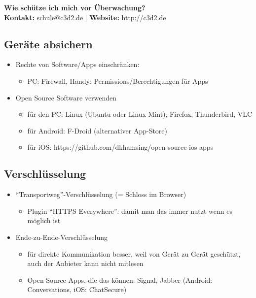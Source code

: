 {\Large \textbf{Wie schütze ich mich vor Überwachung?}}\\
\textbf{Kontakt:} schule@c3d2.de | \textbf{Website:} http://c3d2.de
\vspace{2mm}

\subsection*{Geräte absichern}
\begin{itemize}
  \item Rechte von Software/Apps einschränken:
  \begin{itemize}
    \item PC: Firewall, Handy: Permissions/Berechtigungen für Apps
  \end{itemize}
  \item Open Source Software verwenden
  \begin{itemize}
    \item für den PC: Linux (Ubuntu oder Linux Mint), Firefox, Thunderbird, VLC
    \item für Android: F-Droid (alternativer App-Store)
    \item für iOS: https://github.com/dkhamsing/open-source-ios-apps
  \end{itemize}
\end{itemize}
  
\subsection*{Verschlüsselung}
\begin{itemize}
  \item ``Transportweg''-Verschlüsselung (= Schloss im Browser)
  \begin{itemize}
    \item Plugin ``HTTPS Everywhere'': damit man das immer nutzt wenn es möglich ist
  \end{itemize}
  \item Ende-zu-Ende-Verschlüsselung
  \begin{itemize}
    \item für direkte Kommunikation besser, weil von Gerät zu Gerät geschützt, auch der Anbieter kann nicht mitlesen
    \item Open Source Apps, die das können: Signal, Jabber (Android: Conversations, iOS: ChatSecure)
  \end{itemize}
\end{itemize}

